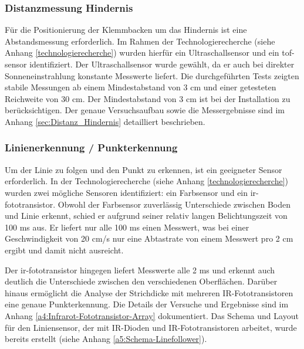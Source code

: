 \documentclass[../main.tex]{subfiles}
\begin{document}
\subsubsection{Distanzmessung Hindernis}
Für die Positionierung der Klemmbacken um das Hindernis ist eine Abstandsmessung erforderlich. Im Rahmen der Technologierecherche (siehe Anhang \ref{technologierecherche}) wurden hierfür ein Ultraschallsensor und ein \acrshort{tof-sensor} identifiziert. Der Ultraschallsensor wurde gewählt, da er auch bei direkter Sonneneinstrahlung konstante Messwerte liefert. Die durchgeführten Tests zeigten stabile Messungen ab einem Mindestabstand von 3 cm und einer getesteten Reichweite von 30 cm. Der Mindestabstand von 3 cm ist bei der Installation zu berücksichtigen. Der genaue Versuchsaufbau sowie die Messergebnisse sind im Anhang \ref{sec:Distanz_Hindernis} detailliert beschrieben.

\subsubsection{Linienerkennung / Punkterkennung}
Um der Linie zu folgen und den Punkt zu erkennen, ist ein geeigneter Sensor erforderlich. In der Technologierecherche (siehe Anhang \ref{technologierecherche}) wurden zwei mögliche Sensoren identifiziert: ein Farbsensor und ein \gls{ir-fototransistor}. Obwohl der Farbsensor zuverlässig Unterschiede zwischen Boden und Linie erkennt, schied er aufgrund seiner relativ langen Belichtungszeit von 100 ms aus. Er liefert nur alle 100 ms einen Messwert, was bei einer Geschwindigkeit von 20 cm/s nur eine Abtastrate von einem Messwert pro 2 cm ergibt und damit nicht ausreicht.

Der \gls{ir-fototransistor} hingegen liefert Messwerte alle 2 ms und erkennt auch deutlich die Unterschiede zwischen den verschiedenen Oberflächen. Darüber hinaus ermöglicht die Analyse der Strichdicke mit mehreren IR-Fototransistoren eine genaue Punkterkennung. Die Details der Versuche und Ergebnisse sind im Anhang \ref{a4:Infrarot-Fototransistor-Array} dokumentiert.
Das Schema und Layout für den Liniensensor, der mit IR-Dioden und IR-Fototransistoren arbeitet, wurde bereits erstellt (siehe Anhang \ref{a5:Schema-Linefollower}).
\end{document}
